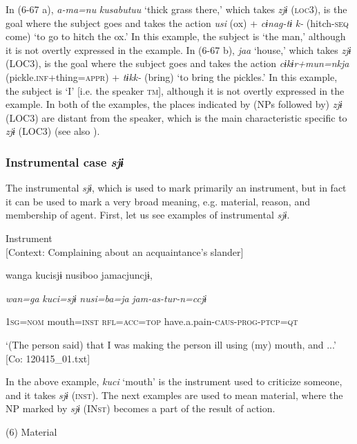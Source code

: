 In (6-67 a), \textit{a-ma=nu} \textit{kusabutuu} ‘thick grass there,’ which takes \textit{zjɨ} (\textsc{loc}3), is the goal where the subject goes and takes the action \textit{usi} (ox) + \textit{cɨnag-tɨ} \textit{k-} (hitch-\textsc{seq} come) ‘to go to hitch the ox.’ In this example, the subject is ‘the man,’ although it is not overtly expressed in the example. In (6-67 b), \textit{jaa} ‘house,’ which takes \textit{zjɨ} (LOC3), is the goal where the subject goes and takes the action \textit{cɨkɨr+mun=nkja} (pickle.\textsc{inf}+thing=\textsc{appr}) + \textit{tɨkk-} (bring) ‘to bring the pickles.’ In this example, the subject is ‘I’ [i.e. the speaker \textsc{tm}], although it is not overtly expressed in the example. In both of the examples, the places indicated by (NPs followed by) \textit{zjɨ} (LOC3) are distant from the speaker, which is the main characteristic specific to \textit{zjɨ} (LOC3) (see also ).

\subsubsection{Instrumental case \textit{sjɨ}}

The instrumental \textit{sjɨ}, which is used to mark primarily an instrument, but in fact it can be used to mark a very broad meaning, e.g. material, reason, and membership of agent. First, let us see examples of instrumental \textit{sjɨ}.

\ea\label{ex:6-68}
 Instrument\\{}
[Context: Complaining about an acquaintance’s slander]

{\TM}
\gll wanga  kucisjɨ  nusiboo  jamacjuncjɨ,

    \textit{wan=ga}  \textit{kuci=sjɨ}  \textit{nusi=ba=ja}  \textit{jam-as-tur-n=ccjɨ}

    1\textsc{sg}=\textsc{nom}  mouth=\textsc{inst}  \textsc{rfl}=\textsc{acc}=\textsc{top}  have.a.pain-\textsc{caus}-\textsc{prog}-\textsc{ptcp}=\textsc{qt}

\glt    ‘(The person\textit{\textsubscript{} }said) that I was making the person ill using (my) mouth, and ...’ [Co: 120415\_01.txt]
\z

In the above example, \textit{kuci} ‘mouth’ is the instrument used to criticize someone, and it takes \textit{sjɨ} (\textsc{inst}). The next examples are used to mean material, where the NP marked by \textit{sjɨ} (IN\textsc{st}) becomes a part of the result of action.

(6)  Material


